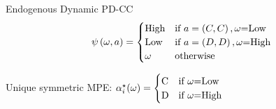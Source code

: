 \documentclass{beamer}
\begin{document}
\begin{frame}{Endogenous Dynamic PD-CC}
\[
\psi\left(\mbox{\ensuremath{\omega}},a\right)=\begin{cases}
\mbox{High} & \mbox{if }a=\left(C,C\right),\mbox{\ensuremath{\omega}=Low}\\
\mbox{Low} & \mbox{if }a=\left(D,D\right),\mbox{\ensuremath{\omega}=High}\\
\omega & \mbox{otherwise}
\end{cases}
\]



Unique symmetric MPE: $\alpha_{i}^{\star}(\omega)=\begin{cases}
\mbox{C} & \mbox{if \ensuremath{\omega}=Low}\\
\mbox{D} & \mbox{if \ensuremath{\omega}=High}
\end{cases}$

\end{frame}
\end{document}
